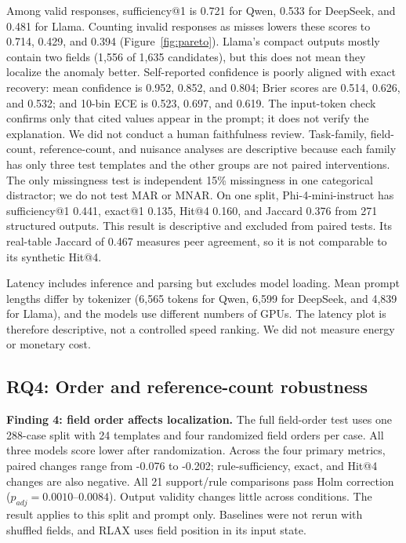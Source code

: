 \documentclass[conference]{IEEEtran}
\begin{document}
Among valid responses, sufficiency@1 is 0.721 for Qwen, 0.533 for DeepSeek, and 0.481 for Llama. Counting invalid responses as misses lowers these scores to 0.714, 0.429, and 0.394 (Figure~\ref{fig:pareto}). Llama's compact outputs mostly contain two fields (1,556 of 1,635 candidates), but this does not mean they localize the anomaly better. Self-reported confidence is poorly aligned with exact recovery: mean confidence is 0.952, 0.852, and 0.804; Brier scores are 0.514, 0.626, and 0.532; and 10-bin ECE is 0.523, 0.697, and 0.619. The input-token check confirms only that cited values appear in the prompt; it does not verify the explanation. We did not conduct a human faithfulness review.
Task-family, field-count, reference-count, and nuisance analyses are descriptive because each family has only three test templates and the other groups are not paired interventions. The only missingness test is independent 15\% missingness in one categorical distractor; we do not test MAR or MNAR. On one split, Phi-4-mini-instruct has sufficiency@1 0.441, exact@1 0.135, Hit@4 0.160, and Jaccard 0.376 from 271 structured outputs. This result is descriptive and excluded from paired tests. Its real-table Jaccard of 0.467 measures peer agreement, so it is not comparable to its synthetic Hit@4.

Latency includes inference and parsing but excludes model loading. Mean prompt lengths differ by tokenizer (6,565 tokens for Qwen, 6,599 for DeepSeek, and 4,839 for Llama), and the models use different numbers of GPUs. The latency plot is therefore descriptive, not a controlled speed ranking. We did not measure energy or monetary cost.



\subsection{RQ4: Order and reference-count robustness}
\textbf{Finding 4: field order affects localization.} The full field-order test uses one 288-case split with 24 templates and four randomized field orders per case. All three models score lower after randomization. Across the four primary metrics, paired changes range from -0.076 to -0.202; rule-sufficiency, exact, and Hit@4 changes are also negative. All 21 support/rule comparisons pass Holm correction ($p_{adj}=0.0010$--$0.0084$). Output validity changes little across conditions. The result applies to this split and prompt only. Baselines were not rerun with shuffled fields, and RLAX uses field position in its input state.
\end{document}
